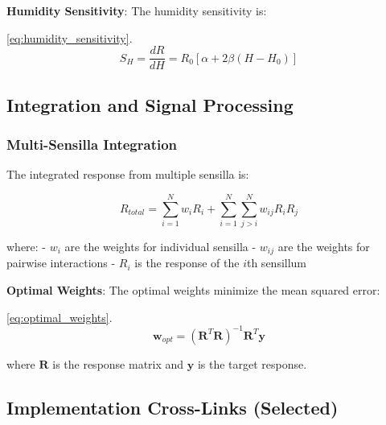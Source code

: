 \documentclass[
  13pt,
  a4paperpaper,
  12pt]{article}
\begin{document}
\textbf{Humidity Sensitivity}: The humidity sensitivity is:

\eqref{eq:humidity_sensitivity}. \begin{equation}
S_H = \frac{dR}{dH} = R_0 [\alpha + 2\beta(H - H_0)] \label{eq:humidity_sensitivity}
\end{equation}

\subsection{Integration and Signal
Processing}\label{integration-and-signal-processing}

\subsubsection{Multi-Sensilla
Integration}\label{multi-sensilla-integration}

The integrated response from multiple sensilla is:

\begin{equation}
R_{total} = \sum_{i=1}^{N} w_i R_i + \sum_{i=1}^{N} \sum_{j>i}^{N} w_{ij} R_i R_j \label{eq:integrated_response}
\end{equation}

where: - \(w_i\) are the weights for individual sensilla - \(w_{ij}\)
are the weights for pairwise interactions - \(R_i\) is the response of
the \(i\)th sensillum

\textbf{Optimal Weights}: The optimal weights minimize the mean squared
error:

\eqref{eq:optimal_weights}. \begin{equation}
\mathbf{w}_{opt} = (\mathbf{R}^T \mathbf{R})^{-1} \mathbf{R}^T \mathbf{y} \label{eq:optimal_weights}
\end{equation}

where \(\mathbf{R}\) is the response matrix and \(\mathbf{y}\) is the
target response.

\subsection{Implementation Cross-Links
(Selected)}\label{implementation-cross-links-selected}
\end{document}
